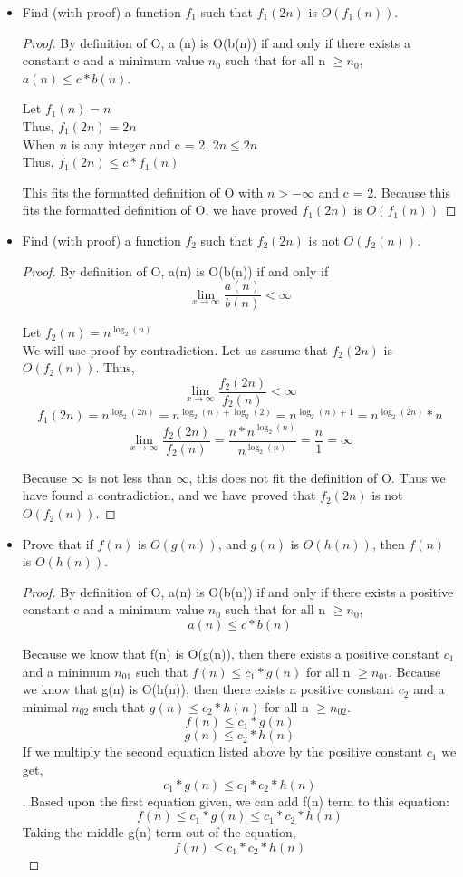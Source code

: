 \documentclass[11pt, solution, letterpaper]{format}
\begin{document}
\begin{enumerate}
\begin{itemize}
\item Find (with proof) a function $f_1$ such that $f_1(2n)$ is $O(f_1(n))$. \\
\begin{proof}
By definition of O, a (n) is O(b(n)) if and only if there exists a constant c and a minimum value $n_0$ such that for all n $\geq n_0$, 
 $a(n) \leq c*b(n)$.
\begin{center} Let $f_1(n) = n$ \\
 Thus, $f_1(2n) = 2n$\\
When $n$ is any integer and c = 2, 
 $2n \leq 2n$ \\
 Thus, $f_1(2n) \leq c *f_1(n)$ \\
\end{center}
This fits the formatted definition of O with $n > -\infty$ and c = 2.
Because this fits the formatted definition of O, we have proved $f_1(2n)$ is $O(f_1(n))$ \end{proof}
\item Find (with proof) a function $f_2$ such that $f_2(2n)$ is not $O(f_2(n))$.
\begin{proof}
By definition of O, a(n) is O(b(n)) if and only if  $$\lim_{x\to\infty} \frac{a(n)}{b(n)} < \infty$$\begin{center} 
Let $f_2(n) = n^{\log_2 (n)}$ \\
We will use proof by contradiction. Let us assume that $f_2(2n)$ is $O(f_2(n))$. Thus,  $$\lim_{x\to\infty} \frac{f_2(2n)}{f_2(n)} < \infty$$
$$f_1(2n) = n^{\log_2 (2n)} = n^{\log_2 (n) + \log_2 (2)} = n^{\log_2 (n) + 1} = n^{\log_2 (2n)}*n$$
$$\lim_{x\to\infty} \frac{f_2(2n)}{f_2(n)} = \frac{n*n^{\log_2 (n)}}{n^{\log_2 (n)}} = \frac{n}{1} = \infty $$ 
\end{center}
Because $\infty$ is not less than $\infty$, this does not fit the definition of O. Thus we have found a contradiction, and we have proved  that $f_2(2n)$ is not $O(f_2(n))$. \end{proof}



\item Prove that if $f(n)$ is $O(g(n))$, and $g(n)$ is $O(h(n))$, then 
$f(n)$ is $O(h(n))$.  

\begin{proof}
By definition of O, a(n) is O(b(n)) if and only if there exists a positive constant c and a minimum value $n_0$ such that for all n $\geq n_0$, 
 $$a(n) \leq c*b(n)$$
 
Because we know that f(n) is O(g(n)), then there exists a positive constant $c_1$ and a minimum $n_{01}$ such that $f(n) \leq c_1*g(n)$ for all n $\geq n_{01}$. Because we know that g(n) is O(h(n)), then there exists a positive constant $c_2$ and a minimal $n_{02}$ such that $g(n) \leq c_2*h(n)$ for all n $\geq n_{02}$.
$$f(n) \leq c_1*g(n)$$$$g(n) \leq c_2*h(n)$$
If we multiply the second equation listed above by the positive constant $c_1$ we get, $$c_1*g(n) \leq c_1*c_2*h(n)$$.
Based upon the first equation given, we can add f(n) term to this equation:
$$f(n) \leq c_1*g(n) \leq c_1*c_2*h(n)$$
Taking the middle g(n) term out of the equation,
$$f(n) \leq c_1*c_2*h(n)$$


\end{proof}
\end{itemize}
\end{enumerate}
\end{document}
